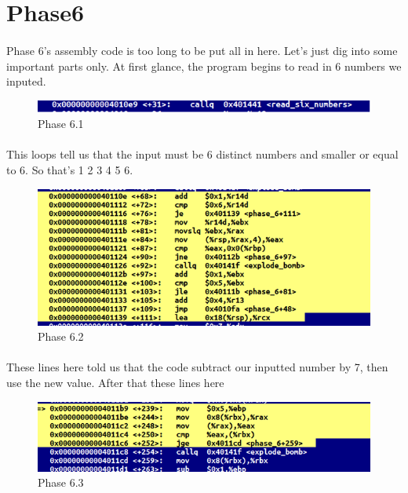 \documentclass[a4paper]{article}
\begin{document}
\section{Phase6}
 

\paragraph{}
Phase 6's assembly code is too long to be put all in here. Let's just dig into some important parts only.
At first glance, the program begins to read in 6 numbers we inputed. 


\begin{figure}[h!]
  \includegraphics[width=\linewidth]{bai6_1.png}
  \caption{Phase 6.1}
  \label{}
\end{figure}

\paragraph{}
This loops tell us that the input must be 6 distinct numbers and smaller or equal to 6. So that's 1 2 3 4 5 6. 

\begin{figure}[h!]
  \includegraphics[width=\linewidth]{bai6_2.png}
  \caption{Phase 6.2}
  \label{}
\end{figure}

\paragraph{}
These lines here told us that the code subtract our inputted number by 7, then use the new value. After that these lines here  


\begin{figure}[h!]
  \includegraphics[width=\linewidth]{bai6_3.png}
  \caption{Phase 6.3}
  \label{}
\end{figure}
\end{document}

